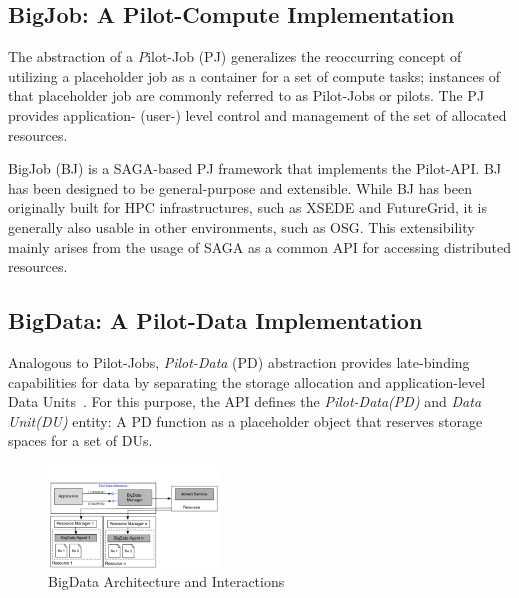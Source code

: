 \documentclass{acm_proc_article-sp}
\newcommand{\upp}{\vspace*{-0.5em}}
\newcommand{\pilotjob}{Pilot-Job\xspace}
\newcommand{\pilotjobs}{Pilot-Jobs\xspace}
\newcommand{\pilotcompute}{Pilot-Compute\xspace}
\newcommand{\dataunit}{Data Unit\xspace}
\newcommand{\dataunits}{Data Units\xspace}
\newcommand{\dus}{DUs\xspace}
\newcommand{\pilotdata}{Pilot-Data\xspace}
\newcommand{\pd}{PD\xspace}
\begin{document}
 
\subsection{BigJob: A \pilotcompute Implementation}

The abstraction of a {\emph \pilotjob} (PJ) generalizes the
reoccurring concept of utilizing a placeholder job as a container for
a set of compute tasks; instances of that placeholder job are commonly
referred to as Pilot-Jobs or pilots. The PJ provides application-
(user-) level control and management of the set of allocated resources.

BigJob (BJ) is a SAGA-based PJ framework that implements the Pilot-API. BJ has
been designed to be general-purpose and extensible. While BJ has been originally
built for HPC infrastructures, such as XSEDE and FutureGrid, it is generally
also usable in other environments, such as OSG. This extensibility mainly arises
from the usage of SAGA as a common API for accessing distributed resources.

\subsection{BigData: A \pilotdata Implementation}

Analogous to \pilotjobs, {\it Pilot-Data} (PD) abstraction provides late-binding
capabilities for data by separating the storage allocation and application-level
\dataunits~\cite{pstar-2012}. For this purpose, the API defines the {\it
\pilotdata (PD)} and {\it \dataunit (DU)} entity: A \pd function as a
placeholder object that reserves storage spaces for a set of \dus.

\begin{figure}[t]
	\upp\upp
	\centering
		\includegraphics[width=0.4\textwidth]{figures/bigdata.pdf}
	\caption{BigData Architecture and Interactions\upp\upp\upp\upp\upp\upp}
	\label{fig:figures_bigdata}
\end{figure}
\end{document}
